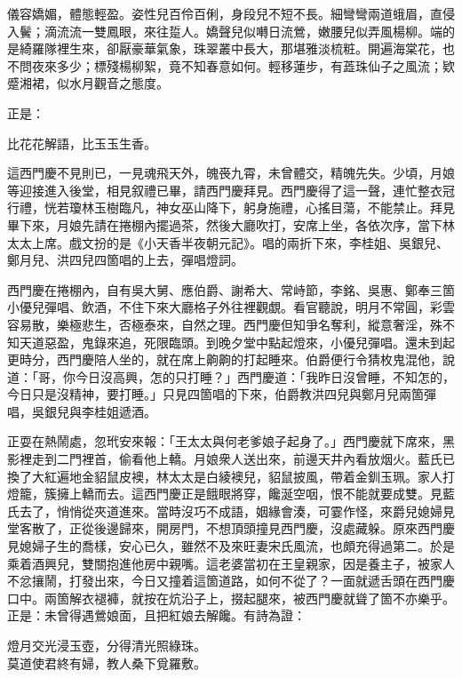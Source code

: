\begin{myquote}
儀容嬌媚，體態輕盈。姿性兒百伶百俐，身段兒不短不長。細彎彎兩道蛾眉，直侵入鬢；滴流流一雙鳳眼，來往踅人。嬌聲兒似囀日流鶯，嫩腰兒似弄風楊柳。端的是綺羅隊裡生來，卻厭豪華氣象，珠翠叢中長大，那堪雅淡梳粧。開遍海棠花，也不問夜來多少；標殘楊柳絮，竟不知春意如何。輕移蓮步，有蕋珠仙子之風流；欵蹙湘裙，似水月觀音之態度。{}
\end{myquote}

正是：

\begin{myquote}
比花花解語，比玉玉生香。
\end{myquote}

這西門慶不見則已，一見魂飛天外，魄䘮九霄，未曾體交，精魄先失。少頃，月娘等迎接進入後堂，相見叙禮已畢，請西門慶拜見。西門慶得了這一聲，連忙整衣冠行禮，恍若瓊林玉樹臨凡，神女巫山降下，躬身施禮，心搖目蕩，不能禁止。{}拜見畢下來，月娘先請在捲棚內擺過茶，然後大廳吹打，安席上坐，各依次序，當下林太太上席。戲文扮的是《小天香半夜朝元記》。唱的兩折下來，李桂姐、吳銀兒、鄭月兒、洪四兒四箇唱的上去，彈唱燈詞。

西門慶在捲棚內，自有吳大舅、應伯爵、謝希大、常峙節，李銘、吳惠、鄭奉三箇小優兒彈唱、飲酒，不住下來大廳格子外往裡觀覷。看官聽說，明月不常圓，彩雲容易散，樂極悲生，否極泰來，自然之理。西門慶但知爭名奪利，縱意奢淫，殊不知天道惡盈，鬼錄來追，死限臨頭。{}到晚夕堂中點起燈來，小優兒彈唱。還未到起更時分，西門慶陪人坐的，就在席上齁齁的打起睡來。伯爵便行令猜枚鬼混他，說道：「哥，你今日沒高興，怎的只打睡？」西門慶道：「我昨日沒曾睡，不知怎的，今日只是沒精神，要打睡。」只見四箇唱的下來，伯爵教洪四兒與鄭月兒兩箇彈唱，吳銀兒與李桂姐遞酒。

正耍在熱鬧處，忽玳安來報：「王太太與何老爹娘子起身了。」{}西門慶就下席來，黑影裡走到二門裡首，偷看他上轎。月娘衆人送出來，前邊天井內看放烟火。藍氏已換了大紅遍地金貂鼠皮襖，林太太是白綾襖兒，貂鼠披風，帶着金釧玉珮。家人打燈籠，簇擁上轎而去。這西門慶正是餓眼將穿，饞涎空咽，恨不能就要成雙。見藍氏去了，悄悄從夾道進來。當時沒巧不成語，姻緣會湊，可霎作怪，來爵兒媳婦見堂客散了，正從後邊歸來，開房門，不想頂頭撞見西門慶，沒處藏躲。原來西門慶見媳婦子生的喬樣，安心已久，雖然不及來旺妻宋氏風流，也頗充得過第二。於是乘着酒興兒，雙關抱進他房中親嘴。這老婆當初在王皇親家，因是養主子，被家人不忿攘鬧，打發出來，今日又撞着這箇道路，如何不從了？{}一面就遞舌頭在西門慶口中。兩箇解衣褪褲，就按在炕沿子上，掇起腿來，被西門慶就聳了箇不亦樂乎。{}正是：未曾得遇鶯娘面，且把紅娘去解饞。有詩為證：

\begin{myquote}
燈月交光浸玉壺，分得清光照綠珠。\\莫道使君終有婦，教人桑下覓羅敷。
\end{myquote}
